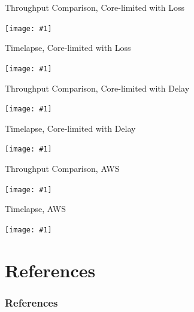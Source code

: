 \documentclass{beamer}
\newcommand{\TitledFigureSlide}[2]{
  \begin{frame}{#2}
    \begin{centering}
      \vfill
      \texttt{[image: \#1]}
      \vfill
      \end{centering}
  \end{frame}
}
\begin{document}
\TitledFigureSlide{figures/lossy.pdf}{Throughput Comparison, Core-limited with Loss}
\TitledFigureSlide{figures/timegrid-lossy.pdf}{Timelapse, Core-limited with Loss}

\TitledFigureSlide{figures/delayed.pdf}{Throughput Comparison, Core-limited with Delay}
\TitledFigureSlide{figures/timegrid-delayed.pdf}{Timelapse, Core-limited with Delay}

\TitledFigureSlide{figures/aws.pdf}{Throughput Comparison, AWS}
\TitledFigureSlide{figures/timegrid-aws.pdf}{Timelapse, AWS}

\section{References}
\begin{frame}[allowframebreaks]
  \frametitle{References}
  
  
\end{frame}
\end{document}

